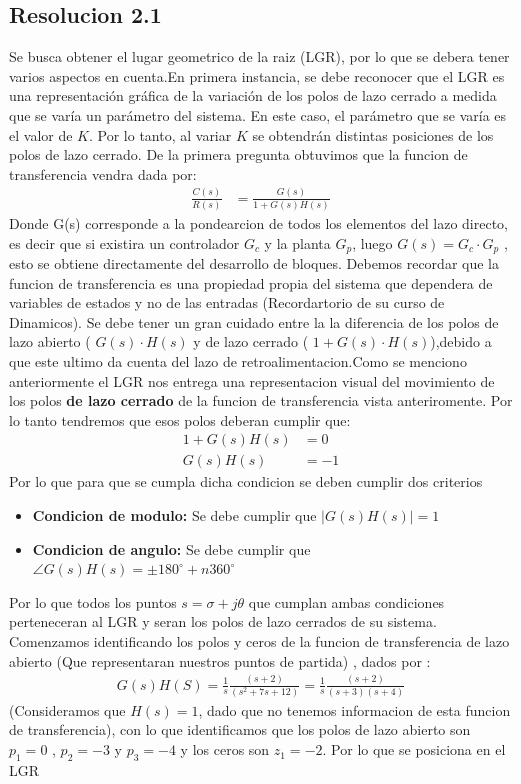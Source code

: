 \documentclass[
  11pt,
  letterpaper,
   addpoints,
   answers
  ]{exam}
\begin{document}
\begin{questions}
\begin{solution}
\subsection*{Resolucion 2.1}
    Se busca obtener el lugar geometrico de la raiz (LGR), por lo que se debera tener varios aspectos en cuenta.En primera instancia, se debe reconocer que el LGR es una representación gráfica de la variación de los polos de lazo cerrado a medida que se varía un parámetro del sistema. En este caso, el parámetro que se varía es el valor de $K$. Por lo tanto, al variar $K$ se obtendrán distintas posiciones de los polos de lazo cerrado. De la primera pregunta obtuvimos que la funcion de transferencia vendra dada por:
    \begin{align}
        \frac{C(s)}{R(s) }&= \frac{G(s)}{1+G(s)H(s)}
    \end{align} 
    Donde G(s) corresponde a la pondearcion de todos los elementos del lazo directo, es decir que si existira un controlador $G_{c}$ y la planta $G_{p}$, luego $G(s) = G_{c} \cdot G_{p}$ , esto se obtiene directamente del desarrollo de bloques. Debemos recordar que la funcion de transferencia es una propiedad propia del sistema que dependera de variables de estados y no de las entradas (Recordartorio de su curso de Dinamicos). Se debe tener un gran cuidado entre la la diferencia de los polos de lazo abierto ( $G(s) \cdot H(s)$ y de lazo cerrado ( $1+G(s) \cdot H(s)$),debido a que este ultimo da cuenta del lazo de retroalimentacion.Como se menciono anteriormente el LGR nos entrega una representacion visual del movimiento de los polos \textbf{de lazo cerrado} de la funcion de transferencia vista anteriromente. Por lo tanto tendremos que esos polos deberan cumplir que:
    \begin{align}
        1+G(s)H(s) &= 0\\
        G(s)H(s) &= -1
    \end{align}
    Por lo que para que se cumpla dicha condicion se deben cumplir dos criterios
    \begin{itemize}
        \item \textbf{Condicion de modulo:} Se debe cumplir que $|G(s)H(s)| = 1$ 
        \item \textbf{Condicion de angulo:} Se debe cumplir que $\angle G(s)H(s) = \pm 180^{\circ} + n360^{\circ}$ 
    \end{itemize}
Por lo que todos los puntos $s = \sigma + j\theta$ que cumplan ambas condiciones perteneceran al LGR y seran los polos de lazo cerrados de su sistema. Comenzamos identificando los polos y ceros de la funcion de transferencia de lazo abierto (Que representaran nuestros puntos de partida) , dados por :
\begin{align}
    G(s)H(S)= \frac{1}{s} \frac{(s+2)}{(s^{2} +7s +12)} = \frac{1}{s} \frac{(s+2)}{(s+3)(s+4)}
\end{align}
(Consideramos que $H(s)=1$, dado que no tenemos informacion de esta funcion de transferencia), con lo que identificamos que los polos de lazo abierto son $p_1=0$ , $p_2=-3$ y $p_3=-4$ y los ceros son $z_1=-2$. Por lo que se posiciona en el LGR


\end{solution}
\end{questions}
\end{document}
